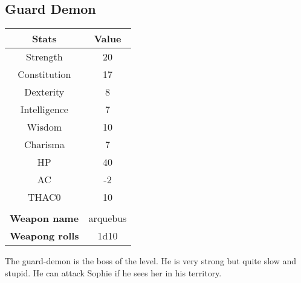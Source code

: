 \subsection{Guard Demon}
\begin{table}[H]
  \centering
\begin{tabular}{|c|c|}
\hline
\rowcolor[HTML]{C0C0C0} 
\textbf{Stats} & \textbf{Value} \\ \hline
Strength & 20 \\ \hline
Constitution & 17 \\ \hline
Dexterity & 8 \\ \hline
Intelligence & 7 \\ \hline
Wisdom & 10 \\ \hline
Charisma & 7 \\ \hline
HP & 40 \\ \hline
AC & -2 \\ \hline
THAC0 & 10 \\ \hline
\multicolumn{2}{|l|}{} \\ \hline
\multicolumn{1}{|l|}{\cellcolor[HTML]{9B9B9B}\textbf{Weapon name}} & \multicolumn{1}{c|}{arquebus} \\ \hline
\multicolumn{1}{|l|}{\cellcolor[HTML]{9B9B9B}\textbf{Weapong rolls}} & \multicolumn{1}{c|}{1d10} \\ \hline
\end{tabular}
\end{table}
The guard-demon is the boss of the level. He is very strong but quite slow and stupid.
He can attack Sophie if he sees her in his territory. 
